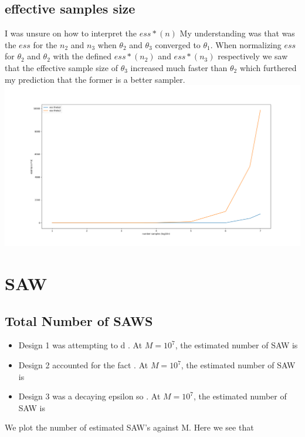 \documentclass[12pt]{article}
\begin{document}
\subsection{effective samples size}
I was unsure on how to interpret the $ess*(n)$ My understanding was that was the $ess$ for the $n_2$ and $n_3$ when $\theta_2$ and $\theta_3$ converged to $\theta_1$. When normalizing $ess$ for $\theta_2$ and $\theta_2$ with the defined $ess*(n_2)$ and $ess*(n_3)$ respectively we saw that the effective sample size of $\theta_3$ increased much faster than $\theta_2$ which furthered my prediction that the former is a better sampler.
\includegraphics[scale=.25]{ess_1}



\newpage

\section{SAW}
\subsection{Total Number of SAWS}
\begin{itemize}
  \item Design 1 was attempting to d . At $M=10^7$, the estimated number of SAW is 
  
  \item Design 2 accounted for the fact . At $M=10^7$, the estimated number of SAW is 
  
  \item Design 3 was a decaying epsilon so . At $M=10^7$, the estimated number of SAW is 
 
\end{itemize}
We plot the number of estimated SAW's against M. Here we see that 
\end{document}
